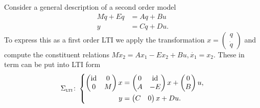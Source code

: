 \begin{example}
    Consider a general description of a second order model
    \begin{align*}
        M \ddot{q} + E \dot{q} &= A q + B u \\
        y &= C q + D u.
    \end{align*}
    To express this as a first order LTI we apply the transformation $x = \begin{pmatrix}
        q \\
        \dot{q}
    \end{pmatrix}$
    and compute the constituent relations $M \dot{x}_2 = A x_1 - E x_2 + Bu, \dot{x_1} = x_2$.
    These in term can be put into LTI form
    \begin{equation*}
        \Sigma_{\textsc{lti}} \colon \left\lbrace
        \begin{aligned}
            \begin{pmatrix}
                \text{id}_{} & 0 \\
                0 & M
            \end{pmatrix} x &= \begin{pmatrix}
                0 & \text{id}_{} \\
                A & -E
            \end{pmatrix} x + \begin{pmatrix}
                0 \\
                B
            \end{pmatrix} u, \\
            y &= \begin{pmatrix}
                C & 0
            \end{pmatrix} x + D u.
        \end{aligned}
        \right.
    \end{equation*}
\end{example}

